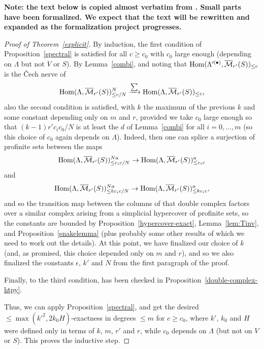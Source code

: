 \begin{remark}
  \label{boundary-text}
  \textbf{Note: the text below is copied almost verbatim from \cite{Analytic}.
  Small parts have been formalized.
  We expect that the text will be rewritten and expanded as the formalization project progresses.}
\end{remark}

\begin{proof}[Proof of Theorem~\ref{explicit}]

By induction, the first condition of Proposition~\ref{spectral} is satisfied for all $c\geq c_0$ with $c_0$ large enough (depending on $\Lambda$ but not $V$ or $S$). By Lemma~\ref{combi}, and noting that $\operatorname{Hom}(\Lambda'^{(\bullet)},\overline{\mathcal M}_{r'}(S))_{\leq c}$ is the \v{C}ech nerve of
\[
\operatorname{Hom}(\Lambda,\overline{\mathcal M}_{r'}(S))_{\leq c/N}^N\xrightarrow{\sum} \operatorname{Hom}(\Lambda,\overline{\mathcal M}_{r'}(S))_{\leq c},
\]
also the second condition is satisfied, with $k$ the maximum of the previous $k$ and some constant depending only on $m$ and $r$, provided we take $c_0$ large enough so that $(k-1)r'c_ic_0/N$ is at least the $d$ of Lemma~\ref{combi} for all $i=0,\ldots,m$ (so this choice of $c_0$ again depends on $\Lambda$). Indeed, then one can splice a surjection of profinite sets between the maps
\[
\operatorname{Hom}(\Lambda,\overline{\mathcal M}_{r'}(S))_{\leq c_ic/N}^{Na}\to\operatorname{Hom}(\Lambda,\overline{\mathcal M}_{r'}(S))_{\leq c_ic}^a
\]
and
\[
\operatorname{Hom}(\Lambda,\overline{\mathcal M}_{r'}(S))_{\leq kc_ic/N}^{Na}\to \operatorname{Hom}(\Lambda,\overline{\mathcal M}_{r'}(S))_{\leq kc_ic}^a,
\]
and so the transition map between the columns of that double complex factors over a similar complex arising from a simplicial hypercover of profinite sets, so the constants are bounded by Proposition~\ref{hypercover-exact},
	Lemma~\ref{lem:Tinv},
	and Proposition~\ref{snakelemma}
	(plus probably some other results of which we need to work out the details).
	At this point, we have finalized our choice of $k$ (and, as promised, this choice depended only on $m$ and $r$), and so we also finalized the constants $\epsilon$, $k'$ and $N$ from the first paragraph of the proof.

Finally, to the third condition, has been checked in Proposition~\ref{double-complex-htpy}.

Thus, we can apply Proposition~\ref{spectral}, and get the desired $\leq \max(k'^2,2k_0H)$-exactness in degrees $\leq m$ for $c\geq c_0$, where $k'$, $k_0$ and $H$ were defined only in terms of $k$, $m$, $r'$ and $r$, while $c_0$ depends on $\Lambda$ (but not on $V$ or $S$). This proves the inductive step.
\end{proof}

